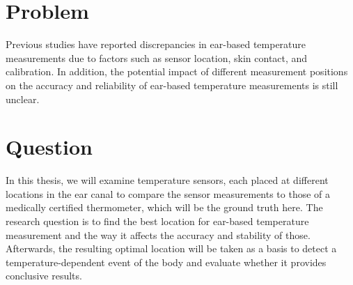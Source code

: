 \section{Problem}
Previous studies have reported discrepancies in ear-based temperature measurements due to factors such as sensor location, skin contact, and calibration. In addition, the potential impact of different measurement positions on the accuracy and reliability of ear-based temperature measurements is still unclear.


\section{Question}
In this thesis, we will examine temperature sensors, each placed at different locations in the ear canal to compare the sensor measurements to those of a medically certified thermometer, which will be the ground truth here. The research question is to find the best location for ear-based temperature measurement and the way it affects the accuracy and stability of those. Afterwards, the resulting optimal location will be taken as a basis to detect a temperature-dependent event of the body and evaluate whether it provides conclusive results.




